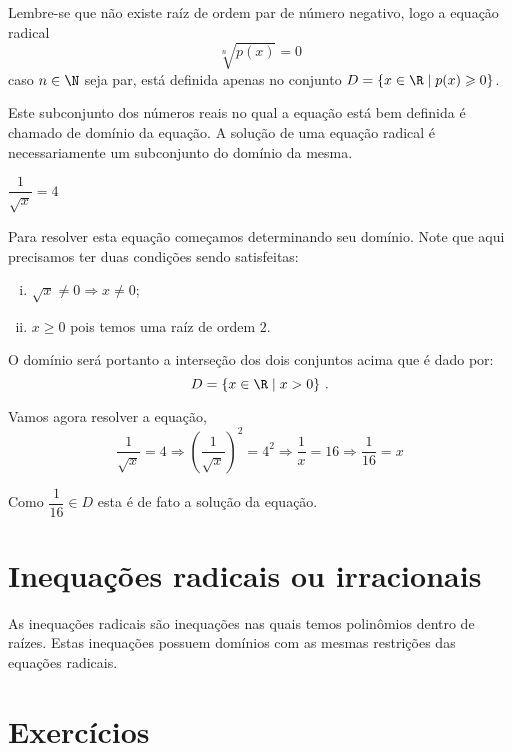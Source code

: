  Lembre-se que não existe raíz de ordem par de número negativo, logo a equação radical
 \[\sqrt[n]{p(x)}= 0\]
 caso $n \in \N$ seja par, está definida apenas no conjunto $D= \{x \in \R \mid p(x) \geqslant 0\}$.
 
 Este subconjunto dos números reais no qual a equação está bem definida é chamado de domínio da equação. A solução de uma equação radical é necessariamente um subconjunto do domínio da mesma.
 
 \begin{exem}
 $\dfrac{1}{\sqrt{x}}= 4$
 
 Para resolver esta equação começamos determinando seu domínio. Note que aqui precisamos ter duas condições sendo satisfeitas:
 \begin{enumerate}[i)]
 \item $\sqrt{x} \neq 0 \Rightarrow x \neq 0$;
 \item $x \geqslant 0$ pois temos uma raíz de ordem $2$.
 \end{enumerate}
 O domínio será portanto a interseção dos dois conjuntos acima que é dado por:
 \[D= \{ x \in \R \mid x > 0 \} \ . \]
 
 Vamos agora resolver a equação, 
 \[\dfrac{1}{\sqrt{x}}= 4 \Rightarrow \left(\dfrac{1}{\sqrt{x}}\right)^2= 4^2 \Rightarrow \dfrac{1}{x}= 16 \Rightarrow \dfrac{1}{16}= x\]
 
 Como $\dfrac{1}{16} \in D$ esta é de fato a solução da equação.
 \end{exem}
 
 \section{Inequações radicais ou irracionais}
 
  \vskip0.3cm
 \colorbox{azul}{
 \begin{minipage}{0.9\linewidth}
 \begin{center}
  As inequações radicais são inequações nas quais temos polinômios dentro de raízes. Estas inequações possuem domínios com as mesmas restrições das equações radicais.
 \end{center}
 \end{minipage}}
 \vskip0.3cm
 
 \section{Exercícios}

\construirExer
